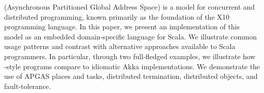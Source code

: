 \apgas (Asynchronous Partitioned Global Address Space) is a model for
concurrent and distributed programming, known primarily as the foundation of
the X10 programming language. In this paper, we present an implementation of
this model as an embedded domain-specific language for Scala. We illustrate
common usage patterns and contrast with alternative approaches available to
Scala programmers. In particular, through two full-fledged examples, we
illustrate how \apgas-style programs compare to idiomatic Akka implementations.
We demonstrate the use of APGAS places and tasks, distributed termination, distributed objects,
and fault-tolerance.
